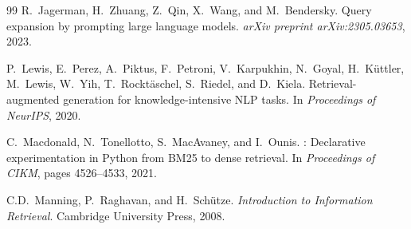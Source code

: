 \documentclass[11pt,a4paper]{article}
\theoremstyle{definition}
\theoremstyle{plain}
\begin{document}
\begin{thebibliography}{99}
R.~Jagerman, H.~Zhuang, Z.~Qin, X.~Wang, and M.~Bendersky.
\newblock Query expansion by prompting large language models.
\newblock \emph{arXiv preprint arXiv:2305.03653}, 2023.

P.~Lewis, E.~Perez, A.~Piktus, F.~Petroni, V.~Karpukhin, N.~Goyal, H.~K\"uttler, M.~Lewis, W.~Yih, T.~Rockt\"aschel, S.~Riedel, and D.~Kiela.
\newblock Retrieval-augmented generation for knowledge-intensive {NLP} tasks.
\newblock In \emph{Proceedings of NeurIPS}, 2020.

C.~Macdonald, N.~Tonellotto, S.~MacAvaney, and I.~Ounis.
: Declarative experimentation in {Python} from {BM25} to dense retrieval.
\newblock In \emph{Proceedings of CIKM}, pages 4526--4533, 2021.

C.D.~Manning, P.~Raghavan, and H.~Sch\"utze.
\newblock \emph{Introduction to Information Retrieval}.
\newblock Cambridge University Press, 2008.

\end{thebibliography}
\end{document}
